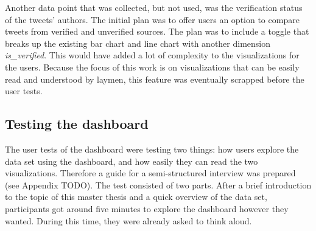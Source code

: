 Another data point that was collected, but not used, was the verification status of the tweets' authors. The initial plan was to offer users an option to compare tweets from verified and unverified sources. The plan was to include a toggle that breaks up the existing bar chart and line chart with another dimension \emph{is\_verified}. This would have added a lot of complexity to the visualizations for the users. Because the focus of this work is on visualizations that can be easily read and understood by laymen, this feature was eventually scrapped before the user tests.

\subsection{Testing the dashboard}
The user tests of the dashboard were testing two things: how users explore the data set using the dashboard, and how easily they can read the two visualizations. Therefore a guide for a semi-structured interview was prepared (see Appendix TODO). %
The test consisted of two parts. After a brief introduction to the topic of this master thesis and a quick overview of the data set, participants got around five minutes to explore the dashboard however they wanted. During this time, they were already asked to think aloud.

